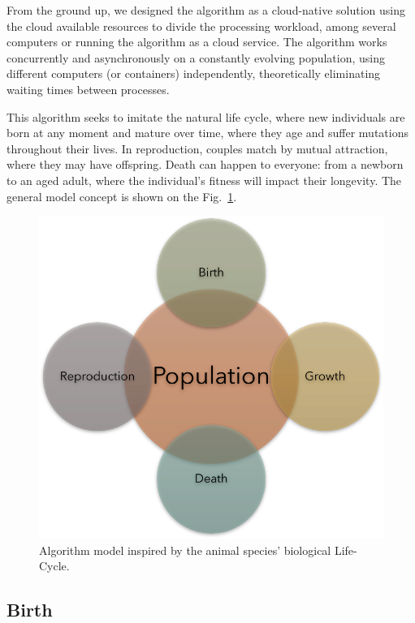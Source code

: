 \documentclass[runningheads]{llncs}
\begin{document}
From the ground up, we designed the algorithm as a cloud-native solution using
the cloud available resources to divide the processing workload, among several
computers or running the algorithm as a cloud service. The algorithm works
concurrently and asynchronously on a constantly evolving population, using
different computers (or containers) independently, theoretically eliminating
waiting times between processes.

This algorithm seeks to imitate the natural life cycle, where new individuals
are born at any moment and mature over time, where they age and suffer
mutations throughout their lives. In reproduction, couples match by mutual
attraction, where they may have offspring. Death can happen to everyone: from a
newborn to an aged adult, where the individual's fitness will impact their
longevity. The general model concept is shown on the Fig.~\ref{fig2}.

\begin{figure}
    \includegraphics[width=\textwidth]{img/fig2_proposal.pdf}
    \caption{Algorithm model inspired by the animal species' biological Life-Cycle.} \label{fig2}
    \end{figure}

\subsection{Birth}
\end{document}
